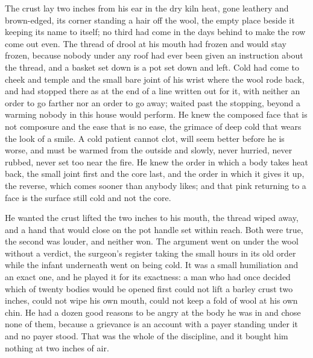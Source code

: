 The crust lay two inches from his ear in the dry kiln heat, gone leathery and brown-edged, its corner standing a hair off the wool, the empty place beside it keeping its name to itself; no third had come in the days behind to make the row come out even. The thread of drool at his mouth had frozen and would stay frozen, because nobody under any roof had ever been given an instruction about the thread, and a basket set down is a pot set down and left. Cold had come to cheek and temple and the small bare joint of his wrist where the wool rode back, and had stopped there as at the end of a line written out for it, with neither an order to go farther nor an order to go away;  waited past the stopping, beyond a warming nobody in this house would perform. He knew the composed face that is not composure and the ease that is no ease, the grimace of deep cold that wears the look of a smile. A cold patient cannot clot, will seem better before he is worse, and must be warmed from the outside and slowly, never hurried, never rubbed, never set too near the fire. He knew the order in which a body takes heat back, the small joint first and the core last, and the order in which it gives it up, the reverse, which comes sooner than anybody likes; and that pink returning to a face is the surface still cold and not the core.

He wanted the crust lifted the two inches to his mouth, the thread wiped away, and a hand that would close on the pot handle set within reach. Both were true, the second was louder, and neither won. The argument went on under the wool without a verdict, the surgeon's register taking the small hours in its old order while the infant underneath went on being cold. It was a small humiliation and an exact one, and he played it for its exactness: a man who had once decided which of twenty bodies would be opened first could not lift a barley crust two inches, could not wipe his own mouth, could not keep a fold of wool at his own chin. He had a dozen good reasons to be angry at the body he was in and chose none of them, because a grievance is an account with a payer standing under it and no payer stood. That was the whole of the discipline, and it bought him nothing at two inches of air.

\scenebreak


